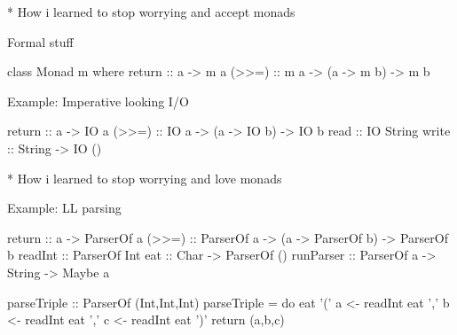 \documentclass{beamer}
\begin{document}
\begin{frame}{* How i learned to stop worrying and accept monads }
\begin{block}{Formal stuff}
\begin{code}
class Monad m where
  return   :: a -> m a
  (>>=)  :: m a -> (a -> m b) -> m b
\end{code}
\end{block}
Example: Imperative looking I/O
\begin{code}
return  :: a     -> IO a
(>>=)   :: IO a  -> (a -> IO b) -> IO b
read    :: IO String
write   :: String -> IO ()
\end{code}
\vspace{-0.8cm}

\end{frame}


\begin{frame}{* How i learned to stop worrying and love monads }

Example: LL parsing 
\begin{code}
return     :: a     -> ParserOf a
(>>=)      :: ParserOf a  -> (a -> ParserOf b) -> ParserOf b
readInt    :: ParserOf Int
eat        :: Char -> ParserOf ()
runParser  :: ParserOf a -> String -> Maybe a
\end{code}
\vspace{-0.5cm}
\begin{code}
parseTriple :: ParserOf (Int,Int,Int)
parseTriple = do  eat '(' 
                  a <- readInt  
                  eat ','
                  b <- readInt
                  eat ','
                  c <- readInt
                  eat ')'
                  return (a,b,c)
\end{code}


\end{frame}
\end{document}
